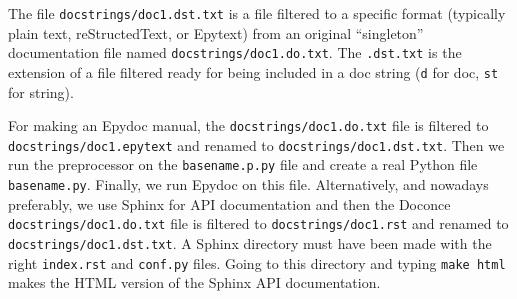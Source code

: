 \documentclass[a4paper,english]{article}
\begin{document}


The file \texttt{docstrings/doc1.dst.txt} is a file filtered to a specific format
(typically plain text, reStructedText, or Epytext) from an original
``singleton'' documentation file named \texttt{docstrings/doc1.do.txt}. The \texttt{.dst.txt}
is the extension of a file filtered ready for being included in a doc
string (\texttt{d} for doc, \texttt{st} for string).

For making an Epydoc manual, the \texttt{docstrings/doc1.do.txt} file is
filtered to \texttt{docstrings/doc1.epytext} and renamed to
\texttt{docstrings/doc1.dst.txt}.  Then we run the preprocessor on the
\texttt{basename.p.py} file and create a real Python file
\texttt{basename.py}. Finally, we run Epydoc on this file. Alternatively, and
nowadays preferably, we use Sphinx for API documentation and then the
Doconce \texttt{docstrings/doc1.do.txt} file is filtered to
\texttt{docstrings/doc1.rst} and renamed to \texttt{docstrings/doc1.dst.txt}. A
Sphinx directory must have been made with the right \texttt{index.rst} and
\texttt{conf.py} files. Going to this directory and typing \texttt{make html} makes
the HTML version of the Sphinx API documentation.
\end{document}
